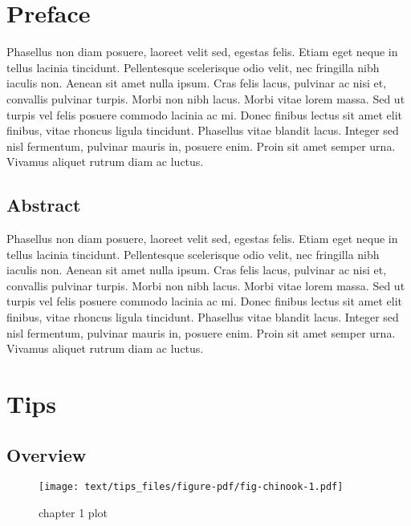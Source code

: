 \documentclass[
  letterpaper,
  oneside]{scrbook}
\begin{document}
\hypertarget{preface}{%
\chapter{Preface}\label{preface}}

Phasellus non diam posuere, laoreet velit sed, egestas felis. Etiam eget
neque in tellus lacinia tincidunt. Pellentesque scelerisque odio velit,
nec fringilla nibh iaculis non. Aenean sit amet nulla ipsum. Cras felis
lacus, pulvinar ac nisi et, convallis pulvinar turpis. Morbi non nibh
lacus. Morbi vitae lorem massa. Sed ut turpis vel felis posuere commodo
lacinia ac mi. Donec finibus lectus sit amet elit finibus, vitae rhoncus
ligula tincidunt. Phasellus vitae blandit lacus. Integer sed nisl
fermentum, pulvinar mauris in, posuere enim. Proin sit amet semper urna.
Vivamus aliquet rutrum diam ac luctus.

\hypertarget{abstract}{%
\section*{Abstract}\label{abstract}}


Phasellus non diam posuere, laoreet velit sed, egestas felis. Etiam eget
neque in tellus lacinia tincidunt. Pellentesque scelerisque odio velit,
nec fringilla nibh iaculis non. Aenean sit amet nulla ipsum. Cras felis
lacus, pulvinar ac nisi et, convallis pulvinar turpis. Morbi non nibh
lacus. Morbi vitae lorem massa. Sed ut turpis vel felis posuere commodo
lacinia ac mi. Donec finibus lectus sit amet elit finibus, vitae rhoncus
ligula tincidunt. Phasellus vitae blandit lacus. Integer sed nisl
fermentum, pulvinar mauris in, posuere enim. Proin sit amet semper urna.
Vivamus aliquet rutrum diam ac luctus.


\hypertarget{tips}{%
\chapter{Tips}\label{tips}}

\hypertarget{overview}{%
\section{Overview}\label{overview}}

\begin{figure}

{\centering \texttt{[image: text/tips\_files/figure-pdf/fig-chinook-1.pdf]}

}

\caption{\label{fig-chinook}chapter 1 plot}

\end{figure}
\end{document}
